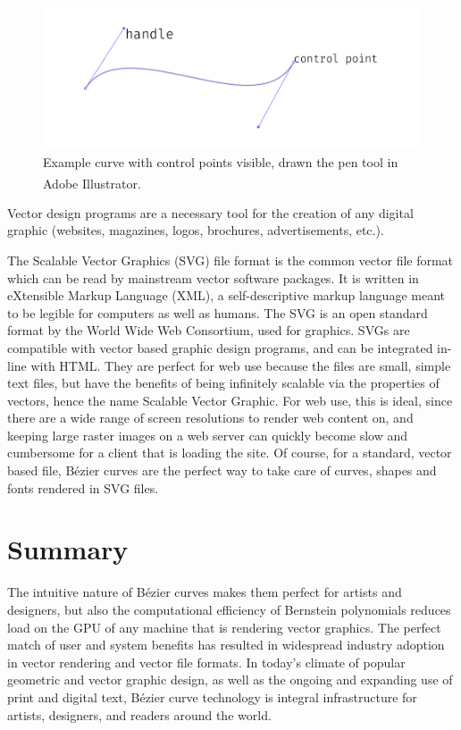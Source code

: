 \documentclass[12pt,letterpaper]{article}
\begin{document}
\begin{figure}[H]
    \centering
    \includegraphics[width=\textwidth]{illustrator-ex}
    \caption{Example curve with control points visible, drawn the pen tool in Adobe Illustrator\textsuperscript{\textregistered{}}.}
\end{figure}

Vector design programs are a necessary tool for the creation of any digital graphic (websites, magazines, logos, brochures, advertisements, etc.). 

The Scalable Vector Graphics (SVG) file format is the common vector file format which can be read by mainstream vector software packages. It is written in eXtensible Markup Language (XML), a self-descriptive markup language meant to be legible for computers as well as humans. The SVG is an open standard format by the World Wide Web Consortium, used for graphics. SVGs are compatible with vector based graphic design programs, and can be integrated in-line with HTML. They are perfect for web use because the files are small, simple text files, but have the benefits of being infinitely scalable via the properties of vectors, hence the name Scalable Vector Graphic. For web use, this is ideal, since there are a wide range of screen resolutions to render web content on, and keeping large raster images on a web server can quickly become slow and cumbersome for a client that is loading the site. Of course, for a standard, vector based file, B\'ezier curves are the perfect way to take care of curves, shapes and fonts rendered in SVG files.

\section{Summary}
The intuitive nature of B\'ezier curves makes them perfect for artists and designers, but also the computational efficiency of Bernstein polynomials reduces load on the GPU of any machine that is rendering vector graphics. The perfect match of user and system benefits has resulted in widespread industry adoption in vector rendering and vector file formats. In today's climate of popular geometric and vector graphic design, as well as the ongoing and expanding use of print and digital text, B\'ezier curve technology is integral infrastructure for artists, designers, and readers around the world. 
\end{document}
